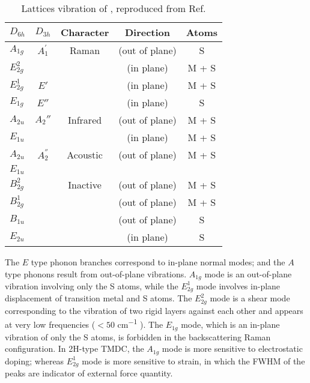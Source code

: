 \begin{table}[htb]
\centering
\caption[Lattices vibration modes of ]{Lattices vibration of , reproduced from Ref.\cite{Molina-Sanchez2011}}\label{tab:tmslattice}
\begin{tabular}{lcccc}
\toprule
 $D_{6h}$   & $D_{3h}$ & Character &  Direction & Atoms  \\
\midrule
$A_{1g}$    &  $A_1^{'}$   & Raman     & (out of plane)  & S  \\
$E_{2g}^2$  &          &           & (in plane)      & M + S  \\
$E_{2g}^1$  &  $E'$    &           & (in plane)      & M + S  \\
$E_{1g}$    &  $E''$    &           & (in plane)      & S  \\
\midrule
$A_{2u}$    &  $A_2''$  & Infrared  & (out of plane)  & M + S  \\
$E_{1u}$    &          &           & (in plane)      & M + S  \\
\midrule
$A_{2u}$    &  $A_2^{''}$   & Acoustic  & (out of plane)  & M + S  \\
$E_{1u}$    &          &           &       &    \\
\midrule
$B_{2g}^2$  &          & Inactive  & (out of plane)  & M + S  \\
$B_{2g}^1$  &          &           & (out of plane)  & M + S  \\
$B_{1u}$    &          &           & (out of plane)  & S  \\
$E_{2u}$    &          &           & (in plane)      & S  \\
\bottomrule
\end{tabular}
\end{table}
The $E$ type phonon branches correspond to in-plane normal modes; and the $A$ type phonons result from out-of-plane vibrations. $A_{1g}$ mode is an out-of-plane vibration involving only the S atoms, while the $E_{2g}^1$ mode involves in-plane displacement of transition metal and S atoms. The $E_{2g}^2$ mode is a shear mode corresponding to the vibration of two rigid layers against
each other and appears at very low frequencies ($<50$ \si{cm^{-1}} \cite{Zhang2013e}). The $E_{1g}$ mode, which is an in-plane vibration of only the S atoms, is forbidden in the backscattering Raman configuration. In 2H-type TMDC, the $A_{1g}$ mode is more sensitive to electrostatic doping; whereas $E_{2g}^1$ mode is more sensitive to strain, in which the FWHM of the peaks are indicator of external force quantity.\cite{Zhao2013}

